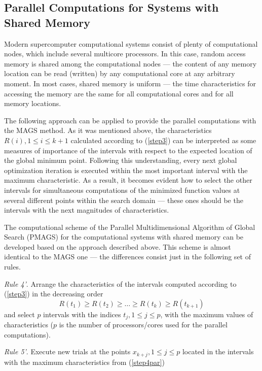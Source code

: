 \documentclass{aims}
\theoremstyle{definition}
\begin{document}
\subsection{Parallel Computations for Systems with Shared Memory}
\label{subsec:sharedpar}
Modern supercomputer computational systems consist of plenty of computational nodes,
which include several multicore processors. In this case, random access memory is
shared among the computational nodes --- the content of any memory location can be read
(written) by any computational core at any arbitrary moment. In most cases, shared memory is
uniform --- the time characteristics for accessing the memory are the same for all
computational cores and for all memory locations.
\par
The following approach can be applied to provide the parallel computations with the MAGS method.
As it was mentioned above, the characteristics \(R(i),1\leq i\leq k+1\) calculated
according to (\ref{step3}) can be interpreted as some measures of importance of the
intervals with respect to the expected location of the global minimum point.
Following this understanding, every next global optimization iteration is executed within
the most important interval with the maximum characteristic. As a result, it becomes
evident how to select the other intervals for simultaneous computations of the minimized
function values at several different points within the search domain --- these ones
should be the intervals with the next magnitudes of characteristics.
\par
The computational scheme of the Parallel Multidimensional Algorithm of Global Search (PMAGS)
for the computational systems with shared memory can be developed based on the approach
described above. This scheme is almost identical to the MAGS one --- the differences
consist just in the following set of rules.
\par
\textit{Rule 4'}. Arrange the characteristics of the intervals computed according to (\ref{step3}) in the decreasing order
\begin{equation}
\label{step4par}
R(t_1)\geq R(t_2)\geq \dots \geq R(t_{k})\geq R(t_{k+1})
\end{equation}
and select \(p\) intervals with the indices \(t_j,1\leq j\leq p\), with the maximum
values of characteristics (\(p\) is the number of processors/cores used for the parallel computations).
\par
\textit{Rule 5'}. Execute new trials at the points \(x_{k+j},1\leq j\leq p\) located
in the intervals with the maximum characteristics from (\ref{step4par})
\end{document}
